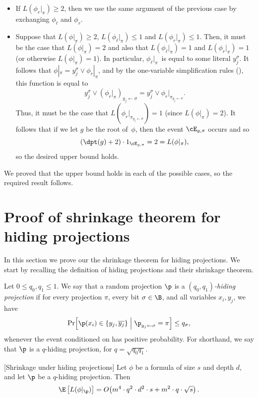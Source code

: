 \begin{itemize}
as required. 
\item If $L(\phi_{r}|_{\pi})\ge2$, then we use the same argument of the
previous case by exchanging $\phi_{\ell}$ and $\phi_{r}$. 
\item Suppose that $L(\phi|_{\pi})\ge2$, $L(\phi_{\ell}|_{\pi})\le1$ and
$L(\phi_{r}|_{\pi})\le1$. Then, it must be the case that $L(\phi|_{\pi})=2$
and also that $L(\phi_{\ell}|_{\pi})=1$ and $L(\phi_{r}|_{\pi})=1$
(or otherwise $L(\phi|_{\pi})=1$). In particular, $\phi_{\ell}|_{\pi}$~is
equal to some literal $y_{j}^{\sigma}$. It follows that $\phi|_{\pi}=y_{j}^{\sigma}\vee\phi_{r}|_{\pi}$,
and by the one-variable simplification rules 
(),
this function is equal to 
\[
y_{j}^{\sigma}\vee\left(\phi_{r}|_{\pi}\right)_{y_{j}\gets\sigma}=y_{j}^{\sigma}\vee\phi_{r}|_{\pi_{y_{j}\gets\sigma}}.
\]
Thus, it must be the case that $L(\phi_{r}|_{\pi_{y_{j}\gets\sigma}})=1$
(since $L(\phi|_{\pi})=2$). It follows that if we let $g$ be the
root of~$\phi$, then the event $\cE_{g,\pi}$ occurs and so 
\[
(\dpt(g)+2)\cdot1_{\cE_{g,\pi}}=2=L(\phi|_{\pi}),
\]
so the desired upper bound holds. 
\end{itemize}
We proved that the upper bound holds in each of the possible cases,
so the required result follows.

\section{\label{sec:shrinkage-hiding}Proof of shrinkage theorem for hiding
projections}

In this section we prove our the shrinkage theorem for hiding projections.
We start by recalling the definition of hiding projections and their
shrinkage theorem.
\begin{repdefinition}{}
Let $0\leq q_{0},q_{1}\leq1$. We say that a random projection $\p$
is a \emph{$(q_{0},q_{1})$-hiding projection} if for every projection
$\pi$, every bit $\sigma\in\B$, and all variables $x_{i},y_{j}$,
we have 
\[
\Pr\!\left[\p(x_{i})\in\left\{ y_{j},\overline{y_{j}}\right\} \;\middle|\;\p_{y_{j}\gets\sigma}=\pi\right]\leq q_{\sigma},
\]
whenever the event conditioned on has positive probability. For shorthand,
we say that $\p$ is a $q$-hiding projection, for $q=\sqrt{q_{0}q_{1}}$. 
\end{repdefinition}

\begin{restated}{}[Shrinkage under hiding projections]
Let $\phi$ be a formula of size $s$ and depth $d$, and let $\p$
be a $q$-hiding projection. Then 
\[
\E\left[L(\phi|_{\p})\right]=O\!\left(m^{4}\cdot q^{2}\cdot d^{2}\cdot s+m^{2}\cdot q\cdot\sqrt{s}\right).
\]
\end{restated}


